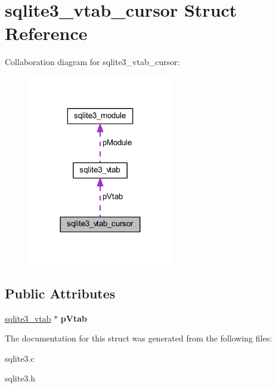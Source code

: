 \hypertarget{structsqlite3__vtab__cursor}{\section{sqlite3\-\_\-vtab\-\_\-cursor Struct Reference}
\label{structsqlite3__vtab__cursor}
}


Collaboration diagram for sqlite3\-\_\-vtab\-\_\-cursor\-:\nopagebreak
\begin{figure}[H]
\begin{center}
\leavevmode
\includegraphics[width=180pt]{structsqlite3__vtab__cursor__coll__graph}
\end{center}
\end{figure}
\subsection*{Public Attributes}
\begin{DoxyCompactItemize}
\item 
\hypertarget{structsqlite3__vtab__cursor_a7bb57f3f9c7c618a9d6d33c6d9820bdc}{\hyperlink{structsqlite3__vtab}{sqlite3\-\_\-vtab} $\ast$ {\bfseries p\-Vtab}}\label{structsqlite3__vtab__cursor_a7bb57f3f9c7c618a9d6d33c6d9820bdc}

\end{DoxyCompactItemize}


The documentation for this struct was generated from the following files\-:\begin{DoxyCompactItemize}
\item 
sqlite3.\-c\item 
sqlite3.\-h\end{DoxyCompactItemize}
